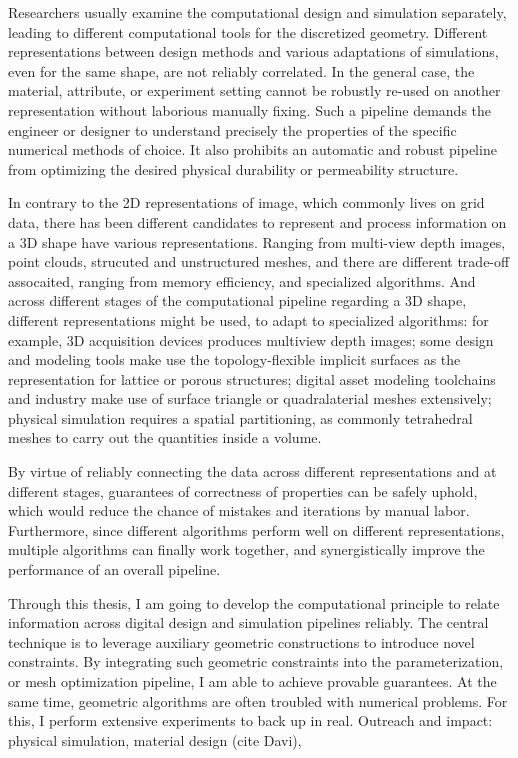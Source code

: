 Researchers usually examine the computational design and simulation separately, leading to different computational tools for the discretized geometry. Different representations between design methods and various adaptations of simulations, even for the same shape, are not reliably correlated. In the general case, the material, attribute, or experiment setting cannot be robustly re-used on another representation without laborious manually fixing. Such a pipeline demands the engineer or designer to understand precisely the properties of the specific numerical methods of choice. It also prohibits an automatic and robust pipeline from optimizing the desired physical durability or permeability structure. 

In contrary to the 2D representations of image, which commonly lives on grid data, there has been different candidates to represent and process information on a 3D shape have various representations. Ranging from multi-view depth images, point clouds, strucuted and unstructured meshes, and  there are different trade-off assocaited, ranging from memory efficiency, and specialized algorithms. And across different stages of the computational pipeline regarding a 3D shape, different representations might be used, to adapt to specialized algorithms: for example, 3D acquisition devices produces multiview depth images; some design and modeling tools make use the topology-flexible implicit surfaces as the representation for lattice or porous structures; digital asset modeling toolchains and industry make use of surface triangle or quadralaterial meshes extensively; physical simulation requires a spatial partitioning, as commonly tetrahedral meshes to carry out the quantities inside a volume. 


By virtue of reliably connecting the data across different representations and at different stages, guarantees of correctness of properties can be safely uphold, which would reduce the chance of mistakes and iterations by manual labor. 
Furthermore,  since different algorithms perform well on different representations, multiple algorithms can finally work together, and synergistically improve the performance of an overall pipeline.


Through this thesis, I am going to develop the computational principle to relate information across digital design and simulation pipelines reliably. 
The central technique is to leverage auxiliary geometric constructions to introduce novel constraints. 
By integrating such geometric constraints into the parameterization, or mesh optimization pipeline,  I am able to achieve provable guarantees. 
At the same time, geometric algorithms are often troubled with numerical problems. For this, I perform extensive experiments to back up in real.
% 
Outreach and impact:
physical simulation, material design (cite Davi), 

